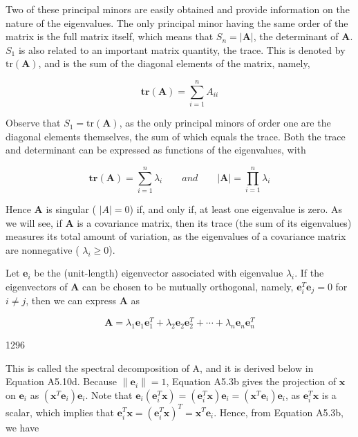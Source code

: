 \documentclass{article}
\begin{document}
Two of these principal minors are easily obtained and provide information on the nature of the eigenvalues. The only principal minor having the same order of the matrix is the full matrix itself, which means that  $ S_n = |\mathbf{A}| $, the determinant of  $ \mathbf{A} $.  $ S_1 $ is also related to an important matrix quantity, the trace. This is denoted by  $ \mathrm{tr}(\mathbf{A}) $, and is the sum of the diagonal elements of the matrix, namely,

\begin{equation}
\mathbf{tr}(\mathbf{A})=\sum_{i=1}^{n}A_{ii}
\end{equation}

Observe that  $ S_1 = \text{tr}(\mathbf{A}) $, as the only principal minors of order one are the diagonal elements themselves, the sum of which equals the trace. Both the trace and determinant can be expressed as functions of the eigenvalues, with

\begin{equation}
\mathbf{tr}(\mathbf{A})=\sum_{i=1}^{n}\lambda_{i}\qquad and\qquad|\mathbf{A}|=\prod_{i=1}^{n}\lambda_{i}
\end{equation}

Hence  $ \mathbf{A} $ is singular ( $ |A|=0 $) if, and only if, at least one eigenvalue is zero. As we will see, if  $ \mathbf{A} $ is a covariance matrix, then its trace (the sum of its eigenvalues) measures its total amount of variation, as the eigenvalues of a covariance matrix are nonnegative ( $ \lambda_i \geq 0 $).

Let $\mathbf{e}_i$ be the (unit-length) eigenvector associated with eigenvalue $\lambda_i$. If the eigenvectors of $\mathbf{A}$ can be chosen to be mutually orthogonal, namely, $\mathbf{e}_i^T \mathbf{e}_j = 0$ for $i \neq j$, then we can express $\mathbf{A}$ as

\begin{equation}
\mathbf{A}=\lambda_{1}\mathbf{e}_{1}\mathbf{e}_{1}^{T}+\lambda_{2}\mathbf{e}_{2}\mathbf{e}_{2}^{T}+\cdots+\lambda_{n}\mathbf{e}_{n}\mathbf{e}_{n}^{T}
\end{equation}

1296

This is called the spectral decomposition of A, and it is derived below in Equation A5.10d. Because  $ \|\mathbf{e}_i\| = 1 $, Equation A5.3b gives the projection of  $ \mathbf{x} $ on  $ \mathbf{e}_i $ as  $ (\mathbf{x}^T \mathbf{e}_i) \mathbf{e}_i $. Note that  $ \mathbf{e}_i(\mathbf{e}_i^T \mathbf{x}) = (\mathbf{e}_i^T \mathbf{x}) \mathbf{e}_i = (\mathbf{x}^T \mathbf{e}_i) \mathbf{e}_i $, as  $ \mathbf{e}_i^T \mathbf{x} $ is a scalar, which implies that  $ \mathbf{e}_i^T \mathbf{x} = (\mathbf{e}_i^T \mathbf{x})^T = \mathbf{x}^T \mathbf{e}_i $. Hence, from Equation A5.3b, we have
\end{document}
